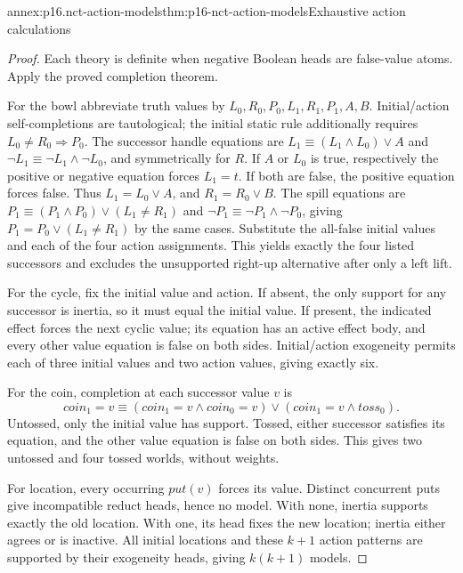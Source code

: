 \begin{annexitem}{annex:p16.nct-action-models}{thm:p16-nct-action-models}{Exhaustive action calculations}
\begin{proof}
Each theory is definite when negative Boolean heads are false-value atoms.
Apply the proved completion theorem.

For the bowl abbreviate truth values by \(L_0,R_0,P_0,L_1,R_1,P_1,A,B\).
Initial/action self-completions are tautological; the initial static rule
additionally requires \(L_0\ne R_0\Rightarrow P_0\).
The successor handle equations are
\(L_1\equiv(L_1\land L_0)\lor A\) and
\(\neg L_1\equiv\neg L_1\land\neg L_0\), and symmetrically for \(R\).
If \(A\) or \(L_0\) is true, respectively the positive or negative equation
forces \(L_1=t\). If both are false, the positive equation forces false.
Thus \(L_1=L_0\lor A\), and \(R_1=R_0\lor B\).
The spill equations are
\(P_1\equiv(P_1\land P_0)\lor(L_1\ne R_1)\) and
\(\neg P_1\equiv\neg P_1\land\neg P_0\), giving
\(P_1=P_0\lor(L_1\ne R_1)\) by the same cases.
Substitute the all-false initial values and each of the four action
assignments. This yields exactly the four listed successors and excludes
the unsupported right-up alternative after only a left lift.

For the cycle, fix the initial value and action.
If absent, the only support for any successor is inertia, so it must equal
the initial value. If present, the indicated effect forces the next cyclic
value; its equation has an active effect body, and every other value
equation is false on both sides. Initial/action exogeneity permits each
of three initial values and two action values, giving exactly six.

For the coin, completion at each successor value \(v\) is
\[
 coin_1=v\equiv(coin_1=v\land coin_0=v)\lor(coin_1=v\land toss_0).
\]
Untossed, only the initial value has support. Tossed, either successor
satisfies its equation, and the other value equation is false on both
sides. This gives two untossed and four tossed worlds, without weights.

For location, every occurring \(put(v)\) forces its value.
Distinct concurrent puts give incompatible reduct heads, hence no model.
With none, inertia supports exactly the old location. With one, its head
fixes the new location; inertia either agrees or is inactive.
All initial locations and these \(k+1\) action patterns are supported
by their exogeneity heads, giving \(k(k+1)\) models.


\end{proof}
\end{annexitem}
